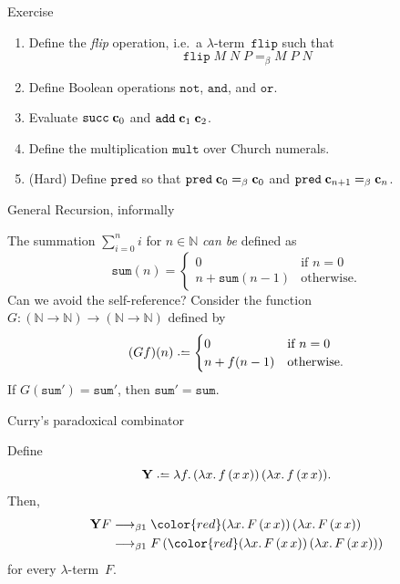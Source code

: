 \begin{frame}{Exercise}
  \begin{enumerate}
    \item Define the \emph{flip} operation, i.e.\ a $\lambda$-term~$\mathtt{flip}$
      such that
      \[
        \mathtt{flip}\;M\;N\;P
        =_\beta M\;P\;N
      \]
    \item Define Boolean operations $\mathtt{not}$, $\mathtt{and}$, and $\mathtt{or}$.
    \item Evaluate $\mathtt{succ}\;\mathbf{c}_0$ and $\mathtt{add}\;\mathbf{c}_{1}\;\mathbf{c}_{2}$. 
    \item Define the multiplication $\mathtt{mult}$ over Church numerals.
    \item (Hard) Define $\mathtt{pred}$ so that $\mathtt{pred}\;\mathbf{c}_0 =_\beta \mathbf{c}_{0}$ and $\mathtt{pred}\;\mathbf{c}_{n+1} =_\beta \mathbf{c}_{n}$.
  \end{enumerate}
\end{frame}
\begin{frame}{General Recursion, informally}

  The summation $\sum_{i = 0}^{n} i$ for $n \in \mathbb{N}$ \emph{can be} defined as
\[
  \mathtt{sum}(n) =
    \begin{cases} 
     0 & \text{if } n = 0 \\
     n + \mathtt{sum}(n - 1)  & \text{otherwise}.
    \end{cases}
\]
Can we avoid the self-reference? Consider the function
$G\colon (\mathbb{N} \to \mathbb{N}) \to (\mathbb{N} \to \mathbb{N})$
defined by
\begin{equation} \label{eq:summation}
  (Gf)(n) \defeq
  \begin{cases}
     0 & \text{if } n = 0 \\
     n + f(n - 1)  & \text{otherwise}.
  \end{cases}
\end{equation}
If $G(\mathtt{sum}') =\mathtt{sum}'$, then $\mathtt{sum}' = \mathtt{sum}$. 

\end{frame}

\begin{frame}{Curry's paradoxical combinator}
\begin{proposition}
  Define
  \[
    \mathbf{Y} \defeq \lambda f.\, (\lambda x.\, f\,(x\,x))\,(\lambda
    x.\,f\,(x\,x)).
  \]
  Then, 
  \begin{align*}
    \mathbf{Y}F
    & \onereduce {\color{red} (\lambda x.\,F\,(x\,x))\,(\lambda x.\, F\,(x\,x))} \\
    & \onereduce F\,({\color{red}(\lambda x.\,F\,(x\,x))\,(\lambda x.\, F\,(x\,x))}) \\
  \end{align*}
  for every $\lambda$-term~$F$. 
\end{proposition}
\end{frame}



